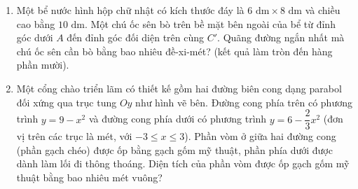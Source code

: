 \documentclass[12pt,a4paper]{article}
\begin{document}
\begin{enumerate}[label=\textbf{Câu \arabic*:}, leftmargin=*]

\item Một bể nước hình hộp chữ nhật có kích thước đáy là $6\text{ dm} \times 8\text{ dm}$ và chiều cao bằng $10\text{ dm}$. Một chú ốc sên bò trên bề mặt bên ngoài của bể từ đỉnh góc dưới $A$ đến đỉnh góc đối diện trên cùng $C'$. Quãng đường ngắn nhất mà chú ốc sên cần bò bằng bao nhiêu đề-xi-mét? (kết quả làm tròn đến hàng phần mười).

\item \begin{minipage}[t]{0.55\linewidth}
Một cổng chào triển lãm có thiết kế gồm hai đường biên cong dạng parabol đối xứng qua trục tung $Oy$ như hình vẽ bên. Đường cong phía trên có phương trình $y = 9 - x^2$ và đường cong phía dưới có phương trình $y = 6 - \dfrac{2}{3}x^2$ (đơn vị trên các trục là mét, với $-3 \le x \le 3$). Phần vòm ở giữa hai đường cong (phần gạch chéo) được ốp bằng gạch gốm mỹ thuật, phần phía dưới được dành làm lối đi thông thoáng. Diện tích của phần vòm được ốp gạch gốm mỹ thuật bằng bao nhiêu mét vuông?
\end{minipage}\hfill
\begin{minipage}[t]{0.42\linewidth}
\vspace{-0.4\baselineskip}
\centering
{}
\end{minipage}


\end{enumerate}
\end{document}
